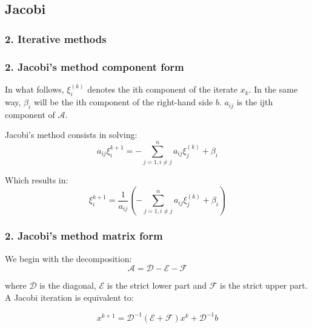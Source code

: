 \subsection{Jacobi}
\begin{frame}
		\frametitle{\textbf{2. Iterative methods}}
	
	
		


\end{frame}

\begin{frame} 
\frametitle{\textbf{2. Jacobi's method component form}}

In what follows, $\xi_i^{(k)}$ denotes the ith component of the iterate $x_k$. In the same way, $\beta_i$ will be the ith component of the right-hand side $b$. $a_{ij}$ is the ijth component of $\mathcal{A}$.

Jacobi's method consists in solving:
\[
a_{ij} \xi_i^{k+1} = - \sum_{j=1,i\neq j}^n a_{ij} \xi_j^{(k)} + \beta_i
\]

Which results in:
\[
 \xi_i^{k+1} = \frac{1}{a_{ij}} \left( - \sum_{j=1,i\neq j}^n a_{ij} \xi_j^{(k)} + \beta_i \right)
\]

\end{frame}

\begin{frame} 
	\frametitle{\textbf{2. Jacobi's method matrix form}}
	
	We begin with the decomposition:
	\[
	\mathcal{A} = \mathcal{D} - \mathcal{E}-\mathcal{F}
	\]
	
	where $\mathcal{D}$ is the diagonal, $\mathcal{E}$ is the strict lower part and $\mathcal{F}$ is the strict upper part. A Jacobi iteration is equivalent to:
	
	\[
	x^{k+1} = \mathcal{D}^{-1} (\mathcal{E} + \mathcal{F})x^{k} + \mathcal{D}^{-1} b
	\]
	
\end{frame}

